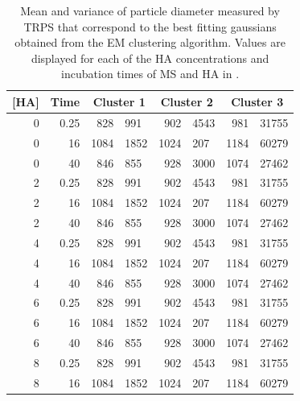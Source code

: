 \documentclass[journal=langd5,manuscript=article]{achemso}
\begin{document}
\begin{table}
\label{tbl:sizes}
\caption{Mean and variance of particle diameter measured by TRPS that correspond to the best fitting gaussians obtained from the EM clustering algorithm. Values are displayed for each of the HA concentrations and incubation times of MS and HA in .}
\begin{tabular}{r r  
r@{$\;\pm$}l  
r@{$\;\pm$}l  
r@{$\;\pm$}l }
[HA] &
Time & 
\multicolumn{2}{c}{Cluster 1}&
\multicolumn{2}{c}{Cluster 2}&
\multicolumn{2}{c}{Cluster 3} \\
\hline  %
  0      &     0.25      &    828       & 991      &    902      &   4543      & 981      &  31755     \\ 
  0      &     16      &   1084       & 1852      &   1024      &    207      & 1184      &  60279     \\ 
  0      &     40      &    846       & 855      &    928      &   3000      & 1074      &  27462     \\ 
  2      &      0.25      &    828       & 991      &    902      &   4543      & 981      &  31755     \\ 
  2      &     16         &   1084       & 1852      &   1024      &    207      & 1184      &  60279     \\ 
  2      &     40         &    846       & 855      &    928      &   3000      & 1074      &  27462     \\ 
  4      &      0.25      &    828       & 991      &    902      &   4543      & 981      &  31755     \\ 
  4      &     16         &   1084       & 1852      &   1024      &    207      & 1184      &  60279     \\ 
  4      &     40         &    846       & 855      &    928      &   3000      & 1074      &  27462     \\ 
  6      &      0.25      &    828       & 991      &    902      &   4543      & 981      &  31755     \\ 
  6      &     16         &   1084       & 1852      &   1024      &    207      & 1184      &  60279     \\ 
  6      &     40         &    846       & 855      &    928      &   3000      & 1074      &  27462     \\ 
  8      &      0.25      &    828       & 991      &    902      &   4543      & 981      &  31755     \\ 
  8      &     16         &   1084       & 1852      &   1024      &    207      & 1184      &  60279     \\ 

\end{tabular}
\end{table}
\end{document}
